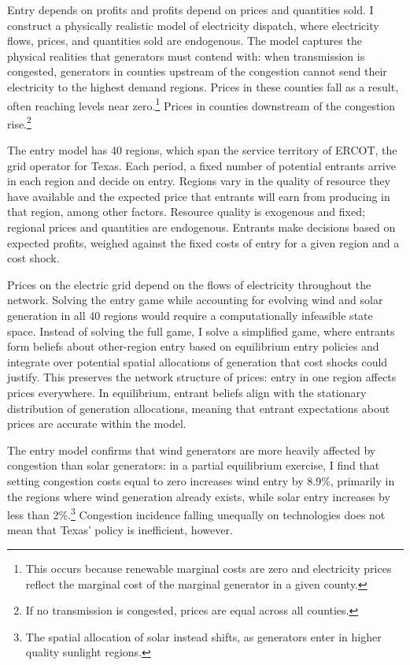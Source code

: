 \documentclass[12pt]{article}
\begin{document}
Entry depends on profits and profits depend on prices and quantities sold. I construct a physically realistic model of electricity dispatch, where electricity flows, prices, and quantities sold are endogenous. The model captures the physical realities that generators must contend with: when transmission is congested, generators in counties upstream of the congestion cannot send their electricity to the highest demand regions. Prices in these counties fall as a result, often reaching levels near zero.\footnote{This occurs because renewable marginal costs are zero and electricity prices reflect the marginal cost of the marginal generator in a given county.} Prices in counties downstream of the congestion rise.\footnote{If no transmission is congested, prices are equal across all counties.}

The entry model has 40 regions, which span the service territory of ERCOT, the grid operator for Texas. Each period, a fixed number of potential entrants arrive in each region and decide on entry. Regions vary in the quality of resource they have available and the expected price that entrants will earn from producing in that region, among other factors. Resource quality is exogenous and fixed; regional prices and quantities are endogenous. Entrants make decisions based on expected profits, weighed against the fixed costs of entry for a given region and a cost shock.

Prices on the electric grid depend on the flows of electricity throughout the network. Solving the entry game while accounting for evolving wind and solar generation in all 40 regions would require a computationally infeasible state space. Instead of solving the full game, I solve a simplified game, where entrants form beliefs about other-region entry based on equilibrium entry policies and integrate over potential spatial allocations of generation that cost shocks could justify. This preserves the network structure of prices: entry in one region affects prices everywhere. In equilibrium, entrant beliefs align with the stationary distribution of generation allocations, meaning that entrant expectations about prices are accurate within the model. 

The entry model confirms that wind generators are more heavily affected by congestion than solar generators: in a partial equilibrium exercise, I find that setting congestion costs equal to zero increases wind entry by 8.9\%, primarily in the regions where wind generation already exists, while solar entry increases by less than 2\%.\footnote{The spatial allocation of solar instead shifts, as generators enter in higher quality sunlight regions.} Congestion incidence falling unequally on technologies does not mean that Texas' policy is inefficient, however. 
\end{document}

